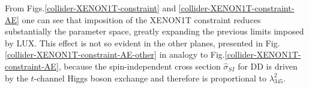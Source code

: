 \documentclass[12pt,a4paper]{article}
\begin{document}
%
From Figs.\ref{collider-XENON1T-constraint} and \ref{collider-XENON1T-constraint-AE}
one can see  that imposition of the XENON1T constraint reduces substantially the parameter space, greatly expanding the previous limits imposed by LUX. This effect is not so evident in the other planes, presented in Fig.\ref{collider-XENON1T-constraint-AE-other}
in analogy to Fig.\ref{collider-XENON1T-constraint-AE},
because the spin-independent cross section $\hat{\sigma}_{SI}$ for DD is driven by the $t$-channel Higgs boson exchange 
and therefore is proportional to $\lambda_{345}^2$.
\begin{figure}[htb]
%
\\
%

\end{figure}
\end{document}
